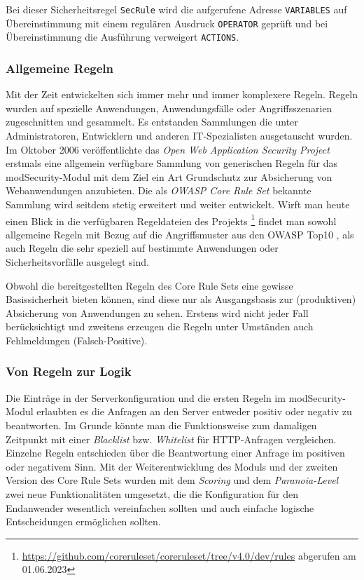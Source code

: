 Bei dieser Sicherheitsregel \verb=SecRule= wird die aufgerufene Adresse \verb=VARIABLES= auf Übereinstimmung mit einem regulären Ausdruck \verb=OPERATOR= geprüft und bei Übereinstimmung die Ausführung verweigert \verb=ACTIONS=.

\subsubsection{Allgemeine Regeln}
Mit der Zeit entwickelten sich immer mehr und immer komplexere Regeln. Regeln wurden auf spezielle Anwendungen, Anwendungsfälle oder Angriffsszenarien zugeschnitten und gesammelt. Es entstanden Sammlungen die unter Administratoren, Entwicklern und anderen IT-Spezialisten ausgetauscht wurden.
Im Oktober 2006 veröffentlichte das \emph{Open Web Application Security Project} erstmals eine allgemein verfügbare Sammlung von generischen Regeln für das modSecurity-Modul mit dem Ziel ein Art Grundschutz zur Absicherung von Webanwendungen anzubieten. Die als \emph{OWASP Core Rule Set} bekannte Sammlung wird seitdem stetig erweitert und weiter entwickelt. Wirft man heute einen Blick in die verfügbaren Regeldateien des Projekts \footnote{\url{https://github.com/coreruleset/coreruleset/tree/v4.0/dev/rules} abgerufen am 01.06.2023} findet man sowohl allgemeine Regeln mit Bezug auf die Angriffsmuster aus den OWASP Top10 \cite{owasp10}, als auch Regeln die sehr speziell auf bestimmte Anwendungen oder Sicherheitsvorfälle ausgelegt sind.

Obwohl die bereitgestellten Regeln des Core Rule Sets eine gewisse Basissicherheit bieten können, sind diese nur als Ausgangsbasis zur (produktiven) Absicherung von Anwendungen zu sehen. Erstens wird nicht jeder Fall berücksichtigt und zweitens erzeugen die Regeln unter Umständen auch Fehlmeldungen (Falsch-Positive).

\subsubsection{Von Regeln zur Logik}
Die Einträge in der Serverkonfiguration und die ersten Regeln im modSecurity-Modul erlaubten es die Anfragen an den Server entweder positiv oder negativ zu beantworten. Im Grunde könnte man die Funktionsweise zum damaligen Zeitpunkt mit einer \emph{Blacklist} bzw. \emph{Whitelist} für HTTP-Anfragen vergleichen. Einzelne Regeln entschieden über die Beantwortung einer Anfrage im positiven oder negativem Sinn. Mit der Weiterentwicklung des Moduls und der zweiten Version des Core Rule Sets wurden mit dem \emph{Scoring} und dem \emph{Paranoia-Level} zwei neue Funktionalitäten umgesetzt, die die Konfiguration für den Endanwender wesentlich vereinfachen sollten und auch einfache logische Entscheidungen ermöglichen sollten.\\

